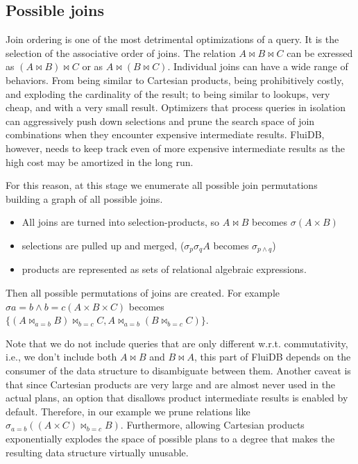 \subsection{Possible joins}
\label{sec:possible_joins}

Join ordering is one of the most detrimental optimizations of a query.
It is the selection of the associative order of joins.
The relation \(A \Join B \Join C\) can be exressed as \((A \Join B) \Join C\)
or as \(A \Join (B \Join C)\).
Individual joins can have a wide range of behaviors. From being
similar to Cartesian products, being prohibitively costly, and exploding the cardinality of the result;
to being similar to lookups, very cheap, and with a very small result.
Optimizers that process queries in isolation can aggressively push down selections
and prune the search space of join combinations when they encounter expensive intermediate results.
FluiDB, however, needs to keep track even of more expensive intermediate results as the
high cost may be amortized in the long run.

For this reason, at this stage we enumerate all possible join permutations building a graph of all possible joins.

\begin{itemize}
\item All joins are turned into selection-products, so \(A \Join B\) becomes
\(\sigma(A \times B)\)
\item selections are pulled up and merged,
(\(\sigma_p \sigma_q A\) becomes \(\sigma_{p \land q}\))
\item products are represented as sets of relational algebraic expressions.
\end{itemize}

Then all possible permutations of joins are created. For example
\(\sigma{a=b \land b=c}(A \times B \times C)\) becomes
\(\{(A \Join_{a=b} B) \Join_{b=c} C, A \Join_{a=b} (B \Join_{b=c}
C)\}\).

Note that we do not include queries that are only different
w.r.t. commutativity, i.e., we don't include both \(A \Join B\) and
\(B \Join A\), this part of FluiDB depends on the consumer of the data
structure to disambiguate between them. Another caveat is that since Cartesian
products are very large and are almost never used in the actual plans, an
option that disallows product intermediate results is enabled by
default. Therefore, in our example we prune relations like
\(\sigma_{a=b}((A \times C) \Join_{b=c}B)\). Furthermore, allowing
Cartesian products exponentially explodes the space of possible plans
to a degree that makes the resulting data structure virtually unusable.

